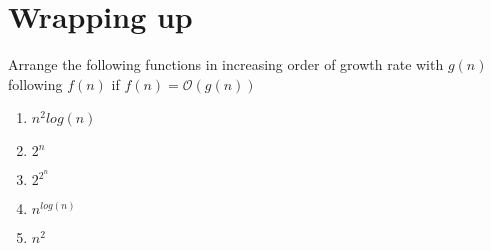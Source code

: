 \section{Wrapping up}

Arrange the following functions in increasing order of growth rate with $g(n)$ following $f(n)$ if $f(n) = \mathcal{O}(g(n))$

\begin{enumerate}
    \item $n^{2}log(n)$
    \item $2^{n}$
    \item $2^{2^{n}}$
    \item $n^{log(n)}$
    \item $n^{2}$
\end{enumerate}


